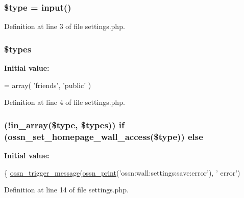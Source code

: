\subsubsection[{\texorpdfstring{\$type}{$type}}]{\setlength{\rightskip}{0pt plus 5cm}\${\bf type} = {\bf input}(\textquotesingle{})}\hypertarget{components_2_ossn_wall_2actions_2wall_2admin_2settings_8php_a9a4a6fba2208984cabb3afacadf33919}{}\label{components_2_ossn_wall_2actions_2wall_2admin_2settings_8php_a9a4a6fba2208984cabb3afacadf33919}


Definition at line 3 of file settings.\+php.

\subsubsection[{\texorpdfstring{\$types}{$types}}]{\setlength{\rightskip}{0pt plus 5cm}\${\bf types}}\hypertarget{components_2_ossn_wall_2actions_2wall_2admin_2settings_8php_a92d70a97331cc6fc0a79d9da50895be8}{}\label{components_2_ossn_wall_2actions_2wall_2admin_2settings_8php_a92d70a97331cc6fc0a79d9da50895be8}
{\bfseries Initial value\+:}
\begin{DoxyCode}
= array(
        \textcolor{stringliteral}{'friends'},
        \textcolor{stringliteral}{'public'}
)
\end{DoxyCode}


Definition at line 4 of file settings.\+php.

\subsubsection[{\texorpdfstring{else}{else}}]{ (!in\+\_\+array(\${\bf type}, \${\bf types})) {\bf if} ({\bf ossn\+\_\+set\+\_\+homepage\+\_\+wall\+\_\+access}(\${\bf type})) else}\hypertarget{components_2_ossn_wall_2actions_2wall_2admin_2settings_8php_a448512a6dada4cd8e4918585968bf038}{}\label{components_2_ossn_wall_2actions_2wall_2admin_2settings_8php_a448512a6dada4cd8e4918585968bf038}
{\bfseries Initial value\+:}
\begin{DoxyCode}
\{
        \hyperlink{ossn_8lib_8system_8php_ab3f23f23f32f50c12e7aea0ffaccaac7}{ossn\_trigger\_message}(\hyperlink{ossn_8lib_8languages_8php_a2be5d1c4b695593a9b9067b96df2150a}{ossn\_print}(\textcolor{stringliteral}{'ossn:wall:settings:save:error'}), \textcolor{stringliteral}{'
      error'})
\end{DoxyCode}


Definition at line 14 of file settings.\+php.

